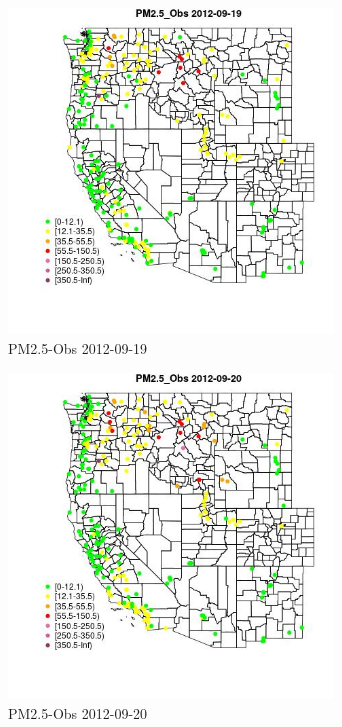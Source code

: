 \begin{figure} 
\centering  
\includegraphics[width=0.77\textwidth]{Code_Outputs/ML_input_report_ML_input_PM25_Step5_part_d_de_duplicated_aves_ML_input_MapObsPM25_Obs2012-09-19.jpg} 
\caption{\label{fig:ML_input_report_ML_input_PM25_Step5_part_d_de_duplicated_aves_ML_inputMapObsPM25_Obs2012-09-19}PM2.5-Obs 2012-09-19} 
\end{figure} 
 

\begin{figure} 
\centering  
\includegraphics[width=0.77\textwidth]{Code_Outputs/ML_input_report_ML_input_PM25_Step5_part_d_de_duplicated_aves_ML_input_MapObsPM25_Obs2012-09-20.jpg} 
\caption{\label{fig:ML_input_report_ML_input_PM25_Step5_part_d_de_duplicated_aves_ML_inputMapObsPM25_Obs2012-09-20}PM2.5-Obs 2012-09-20} 
\end{figure} 
 

